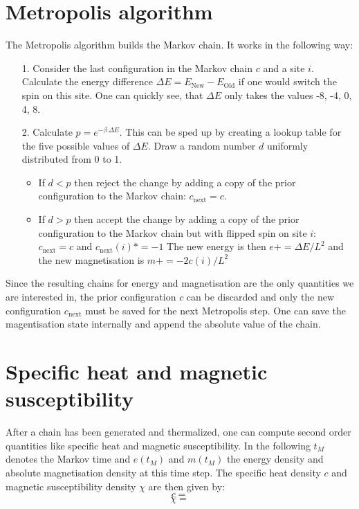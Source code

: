 \documentclass[11pt, a4paper]{scrartcl}
\begin{document}
\section{Metropolis algorithm}
The Metropolis algorithm builds the Markov chain. It works in the following way:
\begin{itemize}
\item[1. ] Consider the last configuration in the Markov chain $c$ and a site $i$. Calculate the energy difference $\Delta E = E_{\mathrm{New}} - E_{\mathrm{Old}}$ if one would switch the spin on this site. One can quickly see, that $\Delta E$ only takes the values -8, -4, 0, 4, 8.
\item[2. ] Calculate $p = e^{- \beta\,\Delta E}$. This can be sped up by creating a lookup table for the five possible values of $\Delta E$. Draw a random number $d$ uniformly distributed from 0 to 1.
    \begin{itemize}
    \item If $d < p$ then reject the change by adding a copy of the prior configuration to the Markov chain: $c_{\mathrm{next}} = c$.
    \item If $d > p$ then accept the change by adding a copy of the prior configuration to the Markov chain but with flipped spin on site $i$: $c_{\mathrm{next}} = c$ and $c_{\mathrm{next}}(i) *= -1$ The new energy is then $e += \Delta E/L^2$ and the new magnetisation is $m += -2c(i)/L^2$
    \end{itemize}
\end{itemize}
Since the resulting chains for energy and magnetisation are the only quantities we are interested in, the prior configuration $c$ can be discarded and only the new configuration $c_{\mathrm{next}}$ must be saved for the next Metropolis step. One can save the magentisation state internally and append the absolute value of the chain.

\section{Specific heat and magnetic susceptibility}
After a chain has been generated and thermalized, one can compute second order quantities like specific heat and magnetic susceptibility. In the following $t_M$ denotes the Markov time and $e(t_M)$ and $m(t_M)$ the energy density and absolute magnetisation density at this time step. The specific heat density $c$ and magnetic susceptibility density $\chi$ are then given by:
$$
c =
$$
$$
\chi = 
$$
\end{document}
